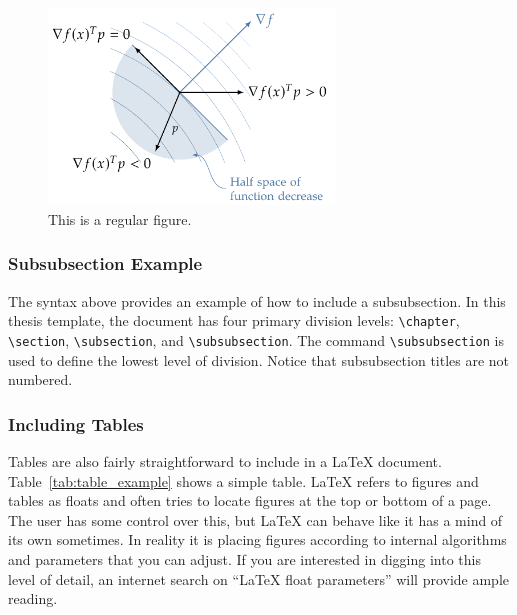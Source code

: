 \begin{figure}[htbp]
	\centering
	\includegraphics[width=3.0in]{figures/gradf_half_space}
	\caption{This is a regular figure.}
	\label{fig:gradf_half_space}
\end{figure}

{\color{mediumgray} \blindtext}

\subsubsection{Subsubsection Example}
The syntax above provides an example of how to include a subsubsection. In this thesis template, the document has four primary division levels: \verb|\chapter|, \verb|\section|, \verb|\subsection|, and \verb|\subsubsection|. The command \verb|\subsubsection| is used to define the lowest level of division. Notice that subsubsection titles are not numbered.

\subsubsection{Including Tables}
Tables are also fairly straightforward to include in a \LaTeX{} document. Table~\ref{tab:table_example} shows a simple table. \LaTeX{} refers to figures and tables as floats and often tries to locate figures at the top or bottom of a page. The user has some control over this, but \LaTeX{} can behave like it has a mind of its own sometimes. In reality it is placing figures according to internal algorithms and parameters that you can adjust. If you are interested in digging into this level of detail, an internet search on ``LaTeX float parameters'' will provide ample reading.

